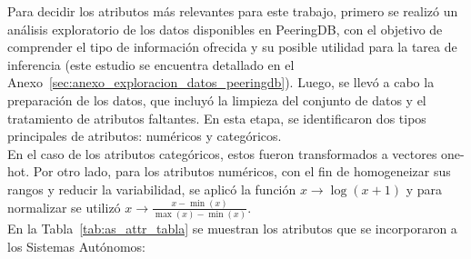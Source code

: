 Para decidir los atributos más relevantes para este trabajo, primero se realizó un análisis exploratorio de los datos disponibles en PeeringDB, con el objetivo de comprender el tipo de información ofrecida y su posible utilidad para la tarea de inferencia (este estudio se encuentra detallado en el Anexo~\ref{sec:anexo_exploracion_datos_peeringdb}). Luego, se llevó a cabo la preparación de los datos, que incluyó la limpieza del conjunto de datos y el tratamiento de atributos faltantes. En esta etapa, se identificaron dos tipos principales de atributos: numéricos y categóricos.\\



En el caso de los atributos categóricos, estos fueron transformados a vectores one-hot. Por otro lado, para los atributos numéricos, con el fin de homogeneizar sus rangos y reducir la variabilidad, se aplicó la función $x \rightarrow \log{(x+1)}$ y para normalizar se utilizó $x \rightarrow \frac{x - \min(x)}{\max(x) - \min(x)}$. \\



En la Tabla~\ref{tab:as_attr_tabla} se muestran los atributos que se incorporaron a los Sistemas Autónomos:\\


